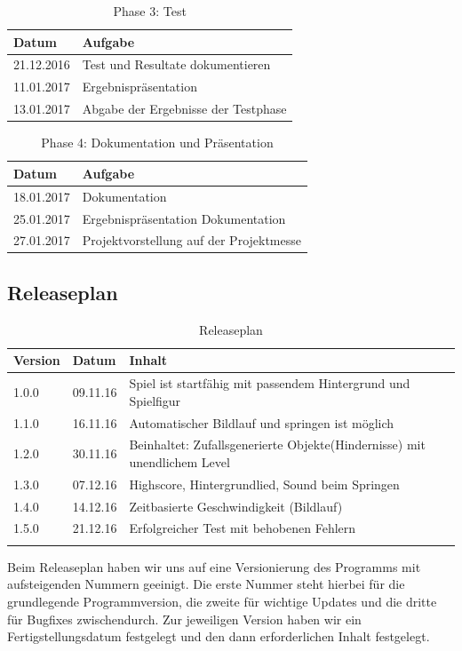\begin{table}[h]
	\begin{tabular}{l|l}
		\toprule
		\textbf{Datum}& \textbf{Aufgabe}\\
		\midrule
		21.12.2016 & Test und Resultate dokumentieren 	\\ 
		11.01.2017 & Ergebnispräsentation	\\
		13.01.2017 & Abgabe der Ergebnisse der Testphase	\\ 
		\bottomrule
	\end{tabular}
	\caption{Phase 3: Test}
\end{table}
\begin{table}[h]
	\begin{tabular}{l|l}
		\toprule
		\textbf{Datum}& \textbf{Aufgabe}\\
		\midrule
		18.01.2017 & Dokumentation 	\\ 
		25.01.2017 & Ergebnispräsentation Dokumentation	\\
		27.01.2017 & Projektvorstellung auf der Projektmesse	\\ 
		\bottomrule
	\end{tabular}
	\caption{Phase 4: Dokumentation und Präsentation}
\end{table}
\newpage
\subsection{Releaseplan}
\begin{longtable}{l|l|p{10cm}}
	\toprule
	\textbf{Version} & \textbf{Datum} & \textbf{Inhalt}\\
	\midrule
	1.0.0 & 09.11.16 & Spiel ist startfähig mit passendem Hintergrund und Spielfigur\\ 
	1.1.0 & 16.11.16 & Automatischer Bildlauf und springen ist möglich\\
	1.2.0 & 30.11.16 & Beinhaltet: Zufallsgenerierte Objekte(Hindernisse) mit unendlichem Level\\ 
	1.3.0 & 07.12.16 & Highscore, Hintergrundlied, Sound beim Springen\\
	1.4.0 & 14.12.16 & Zeitbasierte Geschwindigkeit (Bildlauf)\\
	1.5.0 & 21.12.16 & Erfolgreicher Test mit behobenen Fehlern\\
	\bottomrule
 	\caption{Releaseplan}
\end{longtable}
Beim Releaseplan haben wir uns auf eine Versionierung des Programms mit aufsteigenden Nummern geeinigt. Die erste Nummer steht hierbei für die grundlegende Programmversion, die zweite für wichtige Updates und die dritte für Bugfixes zwischendurch. Zur jeweiligen Version haben wir ein Fertigstellungsdatum festgelegt und den dann erforderlichen Inhalt festgelegt.
\newpage
